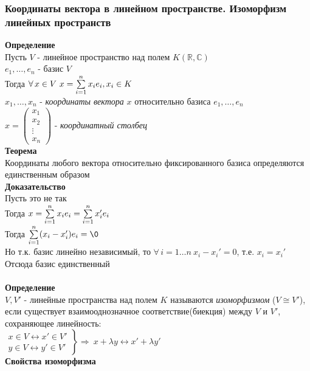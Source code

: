 \documentclass[12pt]{article}
\begin{document}
\subsubsection{Координаты вектора в линейном пространстве. Изоморфизм линейных пространств}
\textbf{Определение}\\
Пусть $V$ - линейное пространство над полем $K(\mathbb{R}, \mathbb{C})$\\
$e_1, \ldots, e_n$ - базис $V$\\
Тогда $\forall\,x\in V\ x=\sum\limits_{i=1}^n x_i e_i, x_i \in K$\\
$x_1, \ldots, x_n$ - \textit{координаты вектора} $x$ относительно базиса $e_1, \ldots, e_n$\\
$x = \begin{pmatrix}
     x_1\\
     x_2\\
     \vdots\\
     x_n
\end{pmatrix}$ - \textit{координатный столбец}\\
\textbf{Теорема}\\
Координаты любого вектора относительно фиксированного базиса определяются единственным образом\\
\textbf{Доказательство}\\
Пусть это не так\\
Тогда $x = \sum\limits_{i=1}^n x_ie_i = \sum\limits_{i=1}^n x_i'e_i$\\
Тогда $\suml_{i=1}^n (x_i - x_i') e_i = \0$\\
Но т.к. базис линейно независимый, то $\forall\,i = 1\ldots n\ x_i-x_i' = 0$, т.е. $x_i = x_i'$\\
Отсюда базис единственный\\\\
\textbf{Определение}\\
$V, V'$ - линейные пространства над полем $K$ называются \textit{изоморфизмом} ($V \cong V'$), если существует взаимооднозначное соответствие(биекция) между $V$ и $V'$, сохраняющее линейность:\\
$\left.\begin{array}{c}
     x \in V \leftrightarrow x'\in V'\\
     y \in V \leftrightarrow y' \in V'
\end{array}\right\} \Rightarrow\ x+\lambda y \leftrightarrow x' + \lambda y'$\\
\textbf{Свойства изоморфизма}
\end{document}
